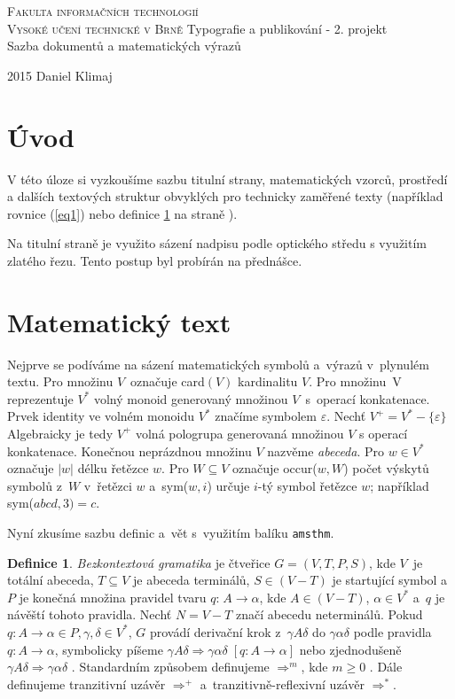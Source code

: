 \documentclass[a4paper,11pt,twocolumn]{article}
\theoremstyle{definition}
\newtheorem{definition}{Definice}[section]
\theoremstyle{plain}
\begin{document}
\begin{titlepage}

\begin{center}
\Huge
\textsc{Fakulta informačních technologií \\
Vysoké učení technické v Brně}
\vfill
\LARGE
Typografie a publikování - 2. projekt \\
Sazba dokumentů a matematických výrazů
\vfill
\end{center}
{\LARGE 2015 \hfill Daniel Klimaj}

\end{titlepage}

\section*{Úvod}
V této úloze si vyzkoušíme sazbu titulní strany, matematických vzorců, prostředí a dalších textových struktur obvyklých pro technicky zaměřené texty (například rovnice (\ref{eq1}) nebo definice \ref{def1} na straně \pageref{def1}).

Na titulní straně je využito sázení nadpisu podle optického středu s využitím zlatého řezu. Tento postup byl probírán na přednášce.


\section{Matematický text}
Nejprve se podíváme na sázení matematických symbolů a~výrazů v~plynulém textu. Pro množinu $V$~označuje card$(V)$ kardinalitu $V$.
Pro množinu~V reprezentuje $V^*$ volný monoid generovaný množinou $V$~s~operací konkatenace.
Prvek identity ve volném monoidu $V^*$ značíme symbolem $\varepsilon$.
Nechť $V^+ = V^* - \{\varepsilon\}$ Algebraicky je tedy $V^+$ volná pologrupa generovaná množinou $V$ s operací konkatenace.
Konečnou neprázdnou množinu $V$ nazvěme \emph{abeceda}.
Pro $w \in V^*$ označuje $|w|$ délku řetězce $w$. Pro $W \subseteq V$ označuje occur($w,W$) počet výskytů symbolů z~$W$ v~řetězci $w$ a~sym($w,i$) určuje $i$\--tý symbol řetězce $w$; například sym($abcd,3)=c$.

Nyní zkusíme sazbu definic a~vět s~využitím balíku \texttt{amsthm}.

\begin{definition}\label{def1}\emph{Bezkontextová gramatika} \normalfont je čtveřice $G=(V,T,P,S)$, kde $V$~je totální abeceda,
$T \subseteq V$ je abeceda terminálů, $S \in (V-T)$ je startující symbol a~$P$ je konečná množina pravidel
tvaru $q$:$\;A\rightarrow\alpha$, kde $A \in (V-T)$, $\alpha \in V^*$ a~$q$ je návěští tohoto pravidla. Nechť $N=V-T$ značí abecedu neterminálů.
Pokud $q:A\rightarrow\alpha\in P,\gamma,\delta\in V^*$, $G$ provádí derivační krok z~$\gamma A\delta$ do $\gamma\alpha\delta$ podle pravidla $q:A\rightarrow\alpha$, symbolicky píšeme 
$\gamma A\delta\Rightarrow\gamma\alpha\delta\;[q:A\rightarrow\alpha]$ nebo zjednodušeně $\gamma A\delta\Rightarrow\gamma\alpha\delta$ . Standardním způsobem definujeme $\Rightarrow^m$, kde $m\ge0$ . Dále definujeme 
tranzitivní uzávěr $\Rightarrow^+$ a~tranzitivně-reflexivní uzávěr $\Rightarrow^*$.\end{definition}
\end{document}
